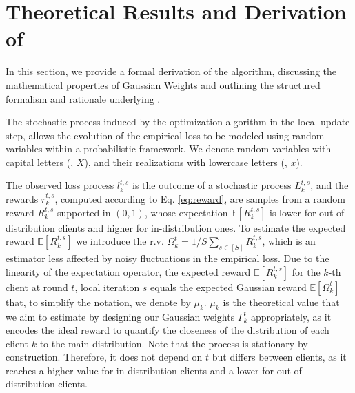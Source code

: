 \section{Theoretical Results and Derivation of \shortname}\label{sec:theory}
In this section, we provide a formal derivation of the algorithm, discussing the mathematical properties of Gaussian Weights and outlining the structured formalism and rationale underlying \shortname.

The stochastic process induced by the optimization algorithm in the local update step, allows the evolution of the empirical loss to be modeled using random variables within a probabilistic framework. We denote random variables with capital letters (\eg , $X$), and their realizations with lowercase letters (\eg, $x$).

The observed loss process $l_k^{t,s}$ is the outcome of a stochastic process $L_k^{t,s}$, and the rewards $r_k^{t,s}$, computed according to Eq. \ref{eq:reward}, are samples from a random reward $R_k^{t,s}$ supported in $(0,1)$, whose expectation $\mathbb{E}[R_k^{t,s}]$ is lower for out-of-distribution clients and higher for in-distribution ones. To estimate the expected reward $\mathbb{E}[R_k^{t,s}]$ we introduce the r.v. $\Omega_k^t = 1/S \sum_{s \in [S]} R_k^{t,s}$, which is an estimator less affected by noisy fluctuations in the empirical loss. Due to the linearity of the expectation operator, the expected reward $\mathbb{E}[R_k^{t,s}]$ for the $k$-th client at round $t$, local iteration $s$ equals the expected Gaussian reward $ \mathbb{E}[\Omega_k^t]$ that, to simplify the notation, we denote by $\mu_k$. $\mu_k$ is the theoretical value that we aim to estimate by designing our Gaussian weights $\Gamma_k^t$ appropriately, as it encodes the ideal reward to quantify the closeness of the distribution of each client $k$ to the main distribution. Note that the process is stationary by construction. Therefore, it does not depend on $t$ but differs between clients, as it reaches a higher value for in-distribution clients and a lower for out-of-distribution clients.

